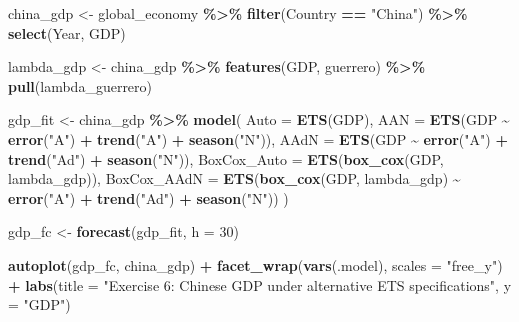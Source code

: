 \documentclass[
  11pt,
]{article}
\newenvironment{Shaded}{\begin{snugshade}}{\end{snugshade}}
\newcommand{\AttributeTok}[1]{\textcolor[rgb]{0.13,0.29,0.53}{#1}}
\newcommand{\DecValTok}[1]{\textcolor[rgb]{0.00,0.00,0.81}{#1}}
\newcommand{\FunctionTok}[1]{\textcolor[rgb]{0.13,0.29,0.53}{\textbf{#1}}}
\newcommand{\NormalTok}[1]{#1}
\newcommand{\OtherTok}[1]{\textcolor[rgb]{0.56,0.35,0.01}{#1}}
\newcommand{\SpecialCharTok}[1]{\textcolor[rgb]{0.81,0.36,0.00}{\textbf{#1}}}
\newcommand{\StringTok}[1]{\textcolor[rgb]{0.31,0.60,0.02}{#1}}
\begin{document}
\begin{Shaded}
\begin{Highlighting}[]
\NormalTok{china\_gdp }\OtherTok{\textless{}{-}}\NormalTok{ global\_economy }\SpecialCharTok{\%\textgreater{}\%}
  \FunctionTok{filter}\NormalTok{(Country }\SpecialCharTok{==} \StringTok{"China"}\NormalTok{) }\SpecialCharTok{\%\textgreater{}\%}
  \FunctionTok{select}\NormalTok{(Year, GDP)}

\NormalTok{lambda\_gdp }\OtherTok{\textless{}{-}}\NormalTok{ china\_gdp }\SpecialCharTok{\%\textgreater{}\%} \FunctionTok{features}\NormalTok{(GDP, guerrero) }\SpecialCharTok{\%\textgreater{}\%} \FunctionTok{pull}\NormalTok{(lambda\_guerrero)}

\NormalTok{gdp\_fit }\OtherTok{\textless{}{-}}\NormalTok{ china\_gdp }\SpecialCharTok{\%\textgreater{}\%}
  \FunctionTok{model}\NormalTok{(}
    \AttributeTok{Auto =} \FunctionTok{ETS}\NormalTok{(GDP),}
    \AttributeTok{AAN =} \FunctionTok{ETS}\NormalTok{(GDP }\SpecialCharTok{\textasciitilde{}} \FunctionTok{error}\NormalTok{(}\StringTok{"A"}\NormalTok{) }\SpecialCharTok{+} \FunctionTok{trend}\NormalTok{(}\StringTok{"A"}\NormalTok{) }\SpecialCharTok{+} \FunctionTok{season}\NormalTok{(}\StringTok{"N"}\NormalTok{)),}
    \AttributeTok{AAdN =} \FunctionTok{ETS}\NormalTok{(GDP }\SpecialCharTok{\textasciitilde{}} \FunctionTok{error}\NormalTok{(}\StringTok{"A"}\NormalTok{) }\SpecialCharTok{+} \FunctionTok{trend}\NormalTok{(}\StringTok{"Ad"}\NormalTok{) }\SpecialCharTok{+} \FunctionTok{season}\NormalTok{(}\StringTok{"N"}\NormalTok{)),}
    \AttributeTok{BoxCox\_Auto =} \FunctionTok{ETS}\NormalTok{(}\FunctionTok{box\_cox}\NormalTok{(GDP, lambda\_gdp)),}
    \AttributeTok{BoxCox\_AAdN =} \FunctionTok{ETS}\NormalTok{(}\FunctionTok{box\_cox}\NormalTok{(GDP, lambda\_gdp) }\SpecialCharTok{\textasciitilde{}} \FunctionTok{error}\NormalTok{(}\StringTok{"A"}\NormalTok{) }\SpecialCharTok{+} \FunctionTok{trend}\NormalTok{(}\StringTok{"Ad"}\NormalTok{) }\SpecialCharTok{+} \FunctionTok{season}\NormalTok{(}\StringTok{"N"}\NormalTok{))}
\NormalTok{  )}

\NormalTok{gdp\_fc }\OtherTok{\textless{}{-}} \FunctionTok{forecast}\NormalTok{(gdp\_fit, }\AttributeTok{h =} \DecValTok{30}\NormalTok{)}

\FunctionTok{autoplot}\NormalTok{(gdp\_fc, china\_gdp) }\SpecialCharTok{+}
  \FunctionTok{facet\_wrap}\NormalTok{(}\FunctionTok{vars}\NormalTok{(.model), }\AttributeTok{scales =} \StringTok{"free\_y"}\NormalTok{) }\SpecialCharTok{+}
  \FunctionTok{labs}\NormalTok{(}\AttributeTok{title =} \StringTok{"Exercise 6: Chinese GDP under alternative ETS specifications"}\NormalTok{, }\AttributeTok{y =} \StringTok{"GDP"}\NormalTok{)}
\end{Highlighting}
\end{Shaded}
\end{document}
